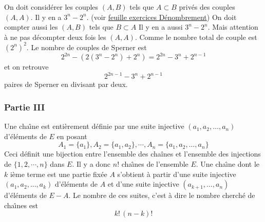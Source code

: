 \begin{enumerate}
On doit considérer les couples $(A,B)$ tels que $A\subset B$ privés des couples $(A,A)$. Il y en a $3^n-2^n$. (voir \href{http://back.maquisdoc.net/data/temptex/fexen.pdf}{feuille exercices Dénombrement})\newline
On doit compter aussi les $(A,B)$ tels que $B\subset A$ Il y en a aussi $3^n-2^n$. Mais attention à ne pas décompter deux fois les $(A,A)$. Comme le nombre total de couple est $(2^n)^2$. Le nombre de couples de Sperner est
\begin{displaymath}
 2^{2n}-\left( 2(3^n-2^n) + 2^n\right) = 2^{2n}-3^n+2^{n-1}
\end{displaymath}
et on retrouve
\begin{displaymath}
 2^{2n-1}-3^n+2^{n-1} 
\end{displaymath}
paires de Sperner en divisant par deux.
\end{enumerate}

\subsubsection*{Partie III}
Une cha{\^\i}ne est entièrement d{\'e}finie par une suite injective $(a_1,a_2,\ldots,a_n)$ d'{\'e}l{\'e}ments de $E$  en posant
\begin{displaymath}
 A_1=\{a_1\}, A_2=\{a_1,a_2\},\cdots,A_n=\{a_1,a_2,\ldots,a_n\}
\end{displaymath}
Ceci définit une bijection entre l'ensemble des chaînes et l'ensemble des injections de $\{1,2,\cdots,n\}$ dans $E$. Il y a donc $n!$ cha{\^\i}nes de l'ensemble $E$.\newline
Une cha{\^\i}ne dont le $k$ i{\`e}me terme est une partie fix{\'e}e $A$ s'obtient {\`a} partir d'une suite injective $(a_1,a_2,\ldots,a_k)$ d'{\'e}l{\'e}ments de $A$ et d'une suite injective $(a_{k+1},\ldots,a_n)$ d'{\'e}l{\'e}ments de $E-A$.\newline
Le nombre de ces suites, c'est {\`a} dire le nombre cherch{\'e} de cha{\^\i}nes est 
\begin{displaymath}
 k!\,(n-k)!
\end{displaymath}

